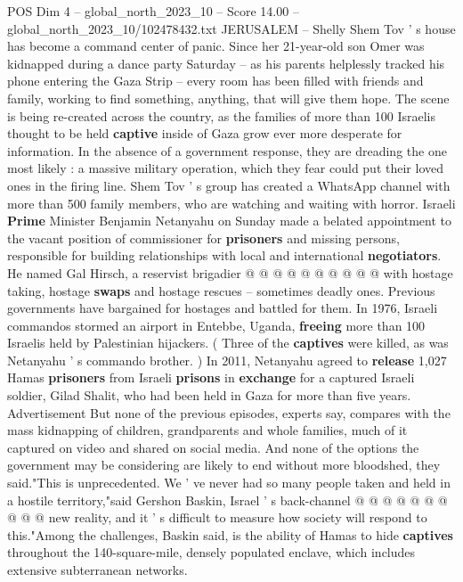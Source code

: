 \begin{textsample}{POS Dim 4 – global\_north\_2023\_10 – Score 14.00 – global\_north\_2023\_10/102478432.txt}  \label{ex:f4_pos_445}
JERUSALEM -- Shelly Shem Tov ' s house has become a command center of panic.
Since her 21-year-old son Omer was kidnapped during a dance party Saturday -- as his parents helplessly tracked his phone entering the Gaza Strip -- every room has been filled with friends and family, working to find something, anything, that will give them hope.
The scene is being re-created across the country, as the families of more than 100 Israelis thought to be held \textbf{captive} inside of Gaza grow ever more desperate for information.
In the absence of a government response, they are dreading the one most likely : a massive military operation, which they fear could put their loved ones in the firing line.
Shem Tov ' s group has created a WhatsApp channel with more than 500 family members, who are watching and waiting with horror.
Israeli \textbf{Prime} Minister Benjamin Netanyahu on Sunday made a belated appointment to the vacant position of commissioner for \textbf{prisoners} and missing persons, responsible for building relationships with local and international \textbf{negotiators}.
He named Gal Hirsch, a reservist brigadier @ @ @ @ @ @ @ @ @ @ with hostage taking, hostage \textbf{swaps} and hostage rescues -- sometimes deadly ones.
Previous governments have bargained for hostages and battled for them.
In 1976, Israeli commandos stormed an airport in Entebbe, Uganda, \textbf{freeing} more than 100 Israelis held by Palestinian hijackers. ( Three of the \textbf{captives} were killed, as was Netanyahu ' s commando brother. ) In 2011, Netanyahu agreed to \textbf{release} 1,027 Hamas \textbf{prisoners} from Israeli \textbf{prisons} in \textbf{exchange} for a captured Israeli soldier, Gilad Shalit, who had been held in Gaza for more than five years.
Advertisement But none of the previous episodes, experts say, compares with the mass kidnapping of children, grandparents and whole families, much of it captured on video and shared on social media.
And none of the options the government may be considering are likely to end without more bloodshed, they said."This is unprecedented.
We ' ve never had so many people taken and held in a hostile territory,"said Gershon Baskin, Israel ' s back-channel @ @ @ @ @ @ @ @ @ @ new reality, and it ' s difficult to measure how society will respond to this."Among the challenges, Baskin said, is the ability of Hamas to hide \textbf{captives} throughout the 140-square-mile, densely populated enclave, which includes extensive subterranean networks.

\end{textsample}
